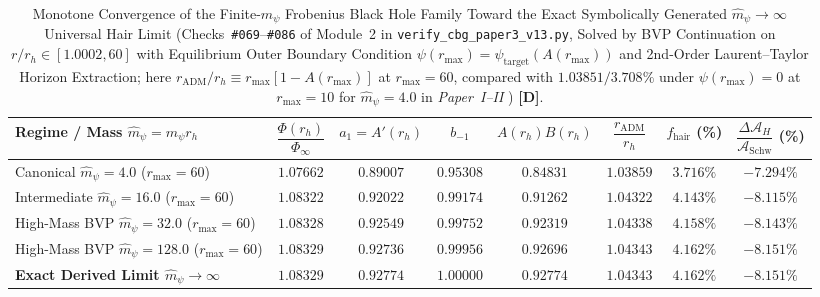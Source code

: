 \documentclass[11pt,a4paper]{article}
\newcommand{\catD}{\textbf{\textcolor{blue!75!black}{[D]}}}
\theoremstyle{plain}
\theoremstyle{definition}
\theoremstyle{remark}
\numberwithin{equation}{section}
\begin{document}
\begin{table}[H]
  \centering
  \caption{Monotone Convergence of the Finite-$\hat{m}_{\psi}$ Frobenius Black Hole Family Toward the Exact Symbolically Generated $\hat{m}_{\psi} \to \infty$ Universal Hair Limit (Checks~\texttt{\#069}--\texttt{\#086} of Module~2 in \texttt{verify\_cbg\_paper3\_v13.py}, Solved by BVP Continuation on $r/r_h \in [1.0002, 60]$ with Equilibrium Outer Boundary Condition $\psi(r_{\max}) = \psi_{\text{target}}(A(r_{\max}))$ and 2nd-Order Laurent--Taylor Horizon Extraction; here $r_{\text{ADM}}/r_h \equiv r_{\max}[1 - A(r_{\max})]$ at $r_{\max} = 60$, compared with $1.03851 / 3.708\%$ under $\psi(r_{\max}) = 0$ at $r_{\max} = 10$ for $\hat{m}_{\psi} = 4.0$ in \textit{Paper~I--II} \cite{jimenez2026a,jimenez2026b}) \catD.}
  \label{tab:universal_hair_convergence}
  \vspace{0.10cm}
  \small
  \setlength{\tabcolsep}{4.0pt}
  \renewcommand{\arraystretch}{1.28}
  \begin{tabularx}{\textwidth}{@{} Y c c c c c c c @{}}
    \toprule
    \textbf{Regime / Mass $\hat{m}_{\psi} = m_{\psi}r_h$} & \textbf{$\dfrac{\Phi(r_h)}{\Phi_{\infty}}$} & \textbf{$a_1 = A'(r_h)$} & \textbf{$b_{-1}$} & \textbf{$A(r_h)B(r_h)$} & \textbf{$\dfrac{r_{\text{ADM}}}{r_h}$} & \textbf{$f_{\text{hair}}$ (\%)} & \textbf{$\dfrac{\Delta\mathcal{A}_H}{\mathcal{A}_{\text{Schw}}}$ (\%)} \\
    \midrule
    Canonical $\hat{m}_{\psi} = 4.0$ ($r_{\max}=60$) & $1.07662$ & $0.89007$ & $0.95308$ & $0.84831$ & $1.03859$ & $3.716\%$ & $-7.294\%$ \\
    Intermediate $\hat{m}_{\psi} = 16.0$ ($r_{\max}=60$) & $1.08322$ & $0.92022$ & $0.99174$ & $0.91262$ & $1.04322$ & $4.143\%$ & $-8.115\%$ \\
    High-Mass BVP $\hat{m}_{\psi} = 32.0$ ($r_{\max}=60$) & $1.08328$ & $0.92549$ & $0.99752$ & $0.92319$ & $1.04338$ & $4.158\%$ & $-8.143\%$ \\
    High-Mass BVP $\hat{m}_{\psi} = 128.0$ ($r_{\max}=60$) & $1.08329$ & $0.92736$ & $0.99956$ & $0.92696$ & $1.04343$ & $4.162\%$ & $-8.151\%$ \\
    \textbf{Exact Derived Limit $\hat{m}_{\psi} \to \infty$} & $\mathbf{1.08329}$ & $\mathbf{0.92774}$ & $\mathbf{1.00000}$ & $\mathbf{0.92774}$ & $\mathbf{1.04343}$ & $\mathbf{4.162\%}$ & $\mathbf{-8.151\%}$ \\
    \bottomrule
  \end{tabularx}
\end{table}
\end{document}
